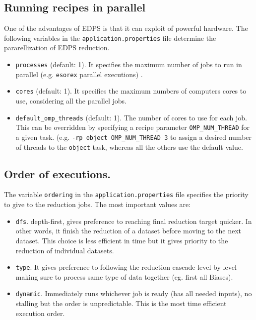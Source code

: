 \subsection{Running recipes in parallel}
One of the advantages of EDPS is that it can exploit of powerful hardware. 
The following variables in the {\tt application.properties} file determine the pararellization of EDPS reduction.
\begin{itemize}
    \item {\tt processes} (default: 1). It specifies the maximum  number of jobs to run in parallel (e.g. {\tt esorex} parallel executions) .
    
    \item {\tt cores} (default: 1). It specifies the maximum numbers of computers cores to use, considering all the parallel jobs.
    
    \item {\tt default\_omp\_threads} (default: 1). The number of cores to use for each job. This can be overridden by specifying a recipe parameter {\tt OMP\_NUM\_THREAD} for a given task. (e.g. {\tt -rp object OMP\_NUM\_THREAD 3} to assign a desired number of threads to the {\tt object} task, whereas all the others use the default value.
\end{itemize}


\subsection{Order of executions.}
The variable {\tt ordering} in the {\tt application.properties} file specifies the priority to give to the reduction jobs. The most important values are:
\begin{itemize}
    \item {\tt dfs}. depth-first, gives preference to reaching final reduction target quicker. In other words, it finish the reduction of a dataset before moving to the next dataset.  This choice is less efficient in time but it gives priority to the reduction of individual datasets. 
    
    \item {\tt type}. It gives preference to following the reduction cascade level by level making sure to process same type of data together (eg. first all Biases).
    
    \item {\tt dynamic}. Immediately runs whichever job is ready (has all needed inputs), no stalling but the order is unpredictable. This is the most time efficient execution order.
\end{itemize}


